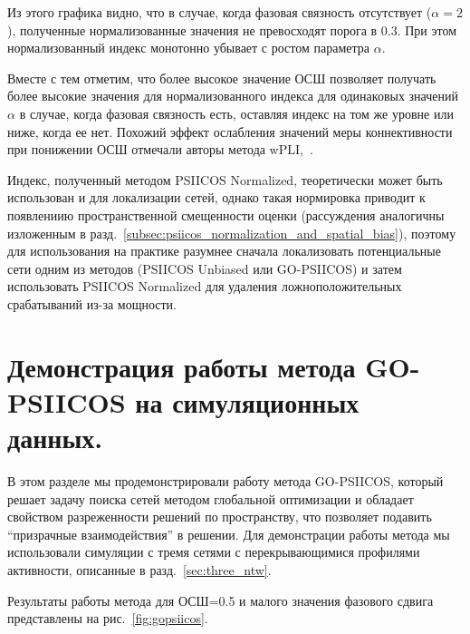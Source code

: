 Из этого графика видно, что в случае, когда фазовая связность отсутствует
($\alpha=2$), полученные нормализованные значения не превосходят порога в 0.3.
При этом нормализованный индекс монотонно убывает с ростом параметра $\alpha$.

Вместе с тем отметим, что более высокое значение ОСШ позволяет получать более
высокие значения для нормализованного индекса для одинаковых значений $\alpha$
в случае, когда фазовая связность есть, оставляя индекс на том же уровне или
ниже, когда ее нет. Похожий эффект ослабления значений меры коннективности при
понижении ОСШ отмечали авторы метода wPLI,~\cite{wPLI}.

Индекс, полученный методом PSIICOS Normalized, теоретически может быть
использован и для локализации сетей, однако такая нормировка приводит к
появлениию пространственной смещенности оценки (рассуждения аналогичны изложенным
в разд.~\ref{subsec:psiicos_normalization_and_spatial_bias}), поэтому для
использования на практике разумнее сначала локализовать потенциальные сети
одним из методов (PSIICOS Unbiased или GO-PSIICOS) и затем использовать
PSIICOS Normalized для удаления ложноположительных срабатываний из-за мощности.

\section{Демонстрация работы метода GO-PSIICOS на симуляционных данных.}

В этом разделе мы продемонстрировали работу метода GO-PSIICOS, который решает
задачу поиска сетей методом глобальной оптимизации и обладает свойством разреженности
решений по пространству, что позволяет подавить ``призрачные взаимодействия'' в
решении. Для демонстрации работы метода мы использовали симуляции с тремя
сетями с перекрывающимися профилями активности, описанные в разд.~\ref{sec:three_ntw}.

Результаты работы метода для ОСШ=0.5 и малого значения фазового сдвига
представлены на рис.~\ref{fig:gopsiicos}.

